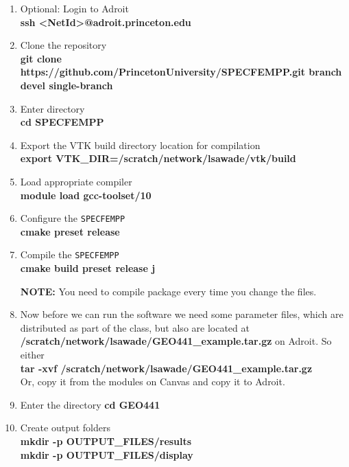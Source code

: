 \documentclass[11pt,titlepage,fleqn]{article}
\begin{document}
\begin{enumerate}

\item Optional: Login to Adroit\\
{\bf ssh <NetId>@adroit.princeton.edu}       
    
\item Clone the repository\\
      {\bf git clone https://github.com/PrincetonUniversity/SPECFEMPP.git \newline \text{-}\text{-}branch devel \text{-}\text{-}single-branch}
\item Enter directory\\
      {\bf cd SPECFEMPP}       
		
\item Export the VTK build directory location for compilation\\
      {\bf export VTK\_DIR=/scratch/network/lsawade/vtk/build}

\item Load appropriate compiler\\
      {\bf module load gcc-toolset/10}

\item Configure the \texttt{SPECFEMPP}\\
      {\bf cmake \text{-}\text{-}preset release}

\item Compile the \texttt{SPECFEMPP}\\
      {\bf cmake \text{-}\text{-}build \text{-}\text{-}preset release \text{-}j}

      {\bf NOTE:} You need to compile package every time you change the files.

\item Now before we can run the software we need some parameter files, which are distributed as part of the class, but also are located at {\bf /scratch/network/lsawade/GEO441\_example.tar.gz} on Adroit. So either \\
      {\bf tar -xvf /scratch/network/lsawade/GEO441\_example.tar.gz}\\
    Or, copy it from the modules on Canvas and copy it to Adroit.
      
\item Enter the directory
      {\bf cd GEO441}

\item Create output folders\\
      {\bf mkdir -p OUTPUT\_FILES/results}\\
      {\bf mkdir -p OUTPUT\_FILES/display}
      

\end{enumerate}
\end{document}
